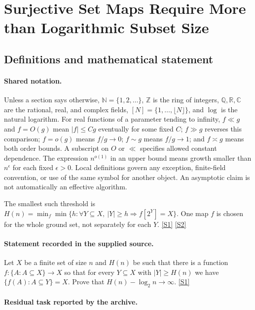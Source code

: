 \documentclass[11pt,a4paper]{article}
\newcommand{\N}{\mathbb{N}}
\newcommand{\Z}{\mathbb{Z}}
\newcommand{\Q}{\mathbb{Q}}
\newcommand{\R}{\mathbb{R}}
\newcommand{\C}{\mathbb{C}}
\newcommand{\sref}[2]{\hyperlink{source:#1:#2}{[S#2]}}
\begin{document}
\section{Surjective Set Maps Require More than Logarithmic Subset Size}\label{statement}


\subsection{Definitions and mathematical statement}

\paragraph{Shared notation.}Unless a section says otherwise, $\N=\{1,2,\ldots\}$,
$\Z$ is the ring of integers, $\Q,\R,\C$ are the rational, real, and complex
fields, $[N]=\{1,\ldots,\lfloor N\rfloor\}$, and $\log$ is the natural
logarithm. For real functions of a parameter tending to infinity,
$f\ll g$ and $f=O(g)$ mean $|f|\leq Cg$ eventually for some fixed $C$;
$f\gg g$ reverses this comparison; $f=o(g)$ means $f/g\to0$;
$f\sim g$ means $f/g\to1$; and $f\asymp g$ means both order bounds.
A subscript on $O$ or $\ll$ specifies allowed constant dependence.
The expression $n^{o(1)}$ in an upper bound means growth smaller than
$n^\epsilon$ for each fixed $\epsilon>0$. Local definitions govern any
exception, finite-field convention, or use of the same symbol for another
object. An asymptotic claim is not automatically an effective algorithm.



The smallest such threshold is $H(n)=\min_f\min\{h:\forall Y\subseteq X,\ |Y|\geq h\Rightarrow f[2^Y]=X\}$. One map $f$ is chosen for the whole ground set, not separately for each $Y$. \sref{statement}{1} \sref{statement}{2}

\paragraph{Statement recorded in the supplied source.}
Let $X$ be a finite set of size $n$ and $H(n)$ be such that there is a function $f:\{A : A\subseteq X\}\to X$ so that for every $Y\subseteq X$ with $\lvert Y\rvert \geq H(n)$ we have $ \{ f(A) : A\subseteq Y\}=X. $ Prove that $ H(n)-\log_2 n \to \infty. $ \sref{statement}{1}

\paragraph{Residual task reported by the archive.}
\end{document}
